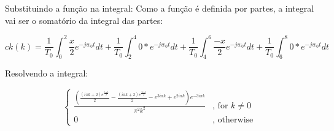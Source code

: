 \documentclass{article}
\begin{document}
Substituindo a função na integral: Como a função é definida por partes,
a integral vai ser o somatório da integral das partes:

\[
ck(k) = \frac{1}{T_0} \int_{0}^{2} \frac{x}{2} e^{-j w_0 t}dt +
\frac{1}{T_0} \int_{2}^{4} 0 * e^{-j w_0 t}dt +
\frac{1}{T_0} \int_{4}^{6} \frac{-x}{2} e^{-j w_0 t}dt + 
\frac{1}{T_0} \int_{6}^{8} 0 * e^{-j w_0 t}dt
\]

Resolvendo a integral:

\[
 \begin{cases} \frac{\left(\frac{\left(i \pi k + 2\right) e^{\frac{5 i \pi k}{2}}}{2} - \frac{\left(i \pi k + 2\right) e^{\frac{3 i \pi k}{2}}}{2} - e^{3 i \pi k} + e^{2 i \pi k}\right) e^{- 3 i \pi k}}{\pi^{2} k^{2}} & \text{, for } k \neq 0 \\ 0 & \text{, otherwise} \end{cases} 
\]
\end{document}
